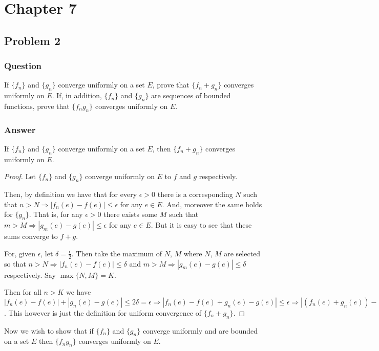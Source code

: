 \documentclass[12pt]{article}
\begin{document}
\section{Chapter 7}
\subsection{Problem 2}

\subsubsection{Question}
If $\{f_n\}$ and $\{g_n\}$ converge uniformly on a set $E$, prove that $\{f_n+g_n\}$ converges uniformly on $E$. If, in addition, $\{f_n\}$ and $\{g_n\}$ are sequences of bounded functions, prove that $\{f_n g_n\}$ converges uniformly on $E$.
\subsubsection{Answer}
If $\{f_n\}$ and $\{g_n\}$ converge uniformly on a set $E$, then $\{f_n+g_n\}$ converges uniformly on $E$.
\begin{proof}
Let $\{f_n\}$ and $\{g_n\}$ converge uniformly  on $E$  to $f$ and $g$ respectively. 

Then, by definition we have that for every $\epsilon > 0 $ there is a corresponding $N$ such that $n>N \Rightarrow | f_n(e) - f(e) | \leq \epsilon$ for any $e \in E$. And, moreover the same holds for $\{g_n\}$. That is, for any $\epsilon >0$ there exists some $M$ such that $m>M \Rightarrow |g_m(e) - g(e)| \leq \epsilon $ for any $e \in E$. But it is easy to see that these sums converge to $f+g$. 

For, given $\epsilon$, let $\delta = \frac{\epsilon}{2}$. Then take the maximum of $N$, $M$ where $N$, $M$ are selected so that $n>N \Rightarrow | f_n(e) - f(e) | \leq \delta$ and  $m>M \Rightarrow |g_m(e) - g(e)| \leq \delta $ respectively. Say $\max{\{N,M\}}=K$.

Then for all $n>K$ we have $|f_n(e)-f(e)| + |g_n(e)-g(e)| \leq 2 \delta = \epsilon \Rightarrow |f_n(e)-f(e) + g_n(e)-g(e)| \leq  \epsilon  \Rightarrow |(f_n(e) + g_n(e)) -(f(e) +g(e))| \leq  \epsilon$. This however is just the definition for uniform convergence of $\{f_n+g_n\}$.\end{proof}

Now we wish to show that if $\{f_n\}$ and $\{g_n\}$ converge uniformly and are bounded on a set $E$ then $\{f_n g_n\}$ converges uniformly on $E$.
\end{document}
